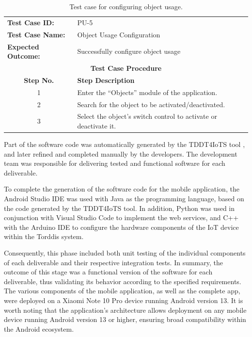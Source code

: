                 \begin{table}[!htbp]
                    \centering
                    \caption{Test case for configuring object usage.}
                    \label{tab:configure-object-usage-test-case}
                    \begin{tabularx}{\textwidth}{l X}
                        \toprule
                        \textbf{Test Case ID:} & PU-5 \\
                        \textbf{Test Case Name:} & Object Usage Configuration \\
                        \textbf{Expected Outcome:} & Successfully configure object usage \\
                        \midrule
                        \multicolumn{2}{c}{\textbf{Test Case Procedure}} \\
                        \midrule
                        \multicolumn{1}{c}{\textbf{Step No.}} & \textbf{Step Description} \\
                        \midrule
                        \multicolumn{1}{c}{1} & Enter the ``Objects'' module of the application. \\
                        \multicolumn{1}{c}{2} & Search for the object to be activated/deactivated. \\
                        \multicolumn{1}{c}{3} & Select the object’s switch control to activate or deactivate it. \\
                        \bottomrule
                    \end{tabularx}
                \end{table}
                Part of the software code was automatically generated by the TDDT4IoTS tool \citep{Guerrero2024Test}, and later refined and completed manually by the developers. The development team was responsible for delivering tested and functional software for each deliverable.
                
                To complete the generation of the software code for the mobile application, the Android Studio IDE \cite{Android2024Android} was used with Java as the programming language, based on the code generated by the TDDT4IoTS tool. In addition, Python was used in conjunction with Visual Studio Code \citep{Microsoft2024Visual} to implement the web services, and C++ with the Arduino IDE \citep{Arduino2024Software} to configure the hardware components of the IoT device within the Torddis system.
                
                Consequently, this phase included both unit testing of the individual components of each deliverable and their respective integration tests. In summary, the outcome of this stage was a functional version of the software for each deliverable, thus validating its behavior according to the specified requirements.
                The various components of the mobile application, as well as the complete app, were deployed on a Xiaomi Note 10 Pro device running Android version 13. It is worth noting that the application's architecture allows deployment on any mobile device running Android version 13 or higher, ensuring broad compatibility within the Android ecosystem.
                
